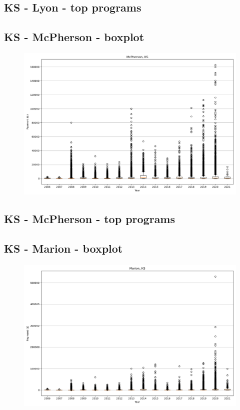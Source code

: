 \subsection*{KS - Lyon - top programs}

\newpage
\subsection*{KS - McPherson - boxplot}
\begin{figure}[h]
\centering
\includegraphics[width=7in]{../output/boxplots/counties/McPherson-KS_boxplot.png}
\end{figure}


\subsection*{KS - McPherson - top programs}

\newpage
\subsection*{KS - Marion - boxplot}
\begin{figure}[h]
\centering
\includegraphics[width=7in]{../output/boxplots/counties/Marion-KS_boxplot.png}
\end{figure}



